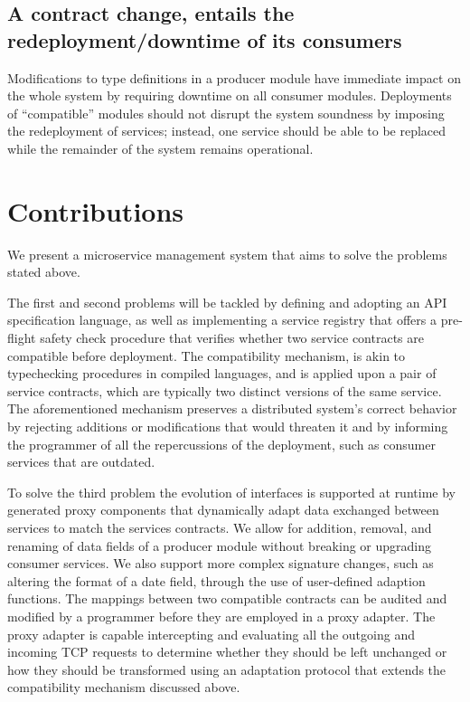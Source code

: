 \subsection{A contract change, entails the redeployment/downtime of its consumers }
Modifications to type definitions in a producer module have immediate
impact on the whole system by requiring downtime on all consumer modules.
Deployments of “compatible” modules should not disrupt the system soundness by imposing the redeployment of services;
instead, one service should be able to be replaced while the remainder of the system remains operational.

\section{Contributions} %
\label{sec:contributions}

We present a microservice management system that aims to solve the problems stated above.

The first and second problems will be tackled by defining and adopting an API specification language, as well as implementing a service
registry that offers a pre-flight safety check procedure that verifies whether two service contracts are compatible before
deployment. The compatibility mechanism, is akin to typechecking procedures in compiled languages, and is applied upon a
pair of service contracts, which are typically two distinct versions of the same service. The aforementioned mechanism preserves
a distributed system's correct behavior by rejecting additions or modifications that would threaten it and by informing the programmer
of all the repercussions of the deployment, such as consumer services that are outdated.

To solve the third problem the evolution of interfaces is supported at runtime by generated proxy components that dynamically
adapt data exchanged between services to match the services contracts.
We allow for addition, removal, and renaming of data fields of a producer module without breaking or upgrading consumer services.
We also support more complex signature changes, such as altering the format of a date field, through the use of user-defined adaption functions.
The mappings between two compatible contracts can be audited and modified by a programmer before they are employed in a proxy adapter.
The proxy adapter is capable intercepting and evaluating all the outgoing and incoming TCP requests to determine whether
they should be left unchanged or how they should be transformed using an adaptation protocol that extends the compatibility mechanism discussed above.


